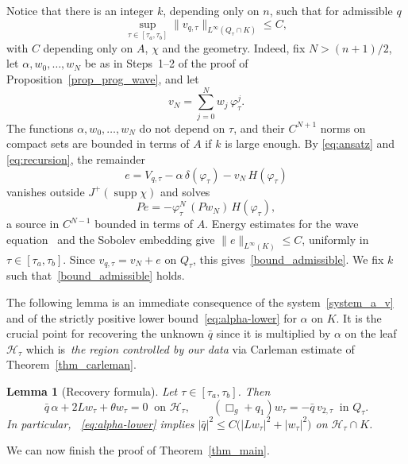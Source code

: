 \documentclass[12pt,reqno]{amsart}
\numberwithin{equation}{section}
\theoremstyle{definition}
\theoremstyle{plain}
\newtheorem{lemma}[theorem]{Lemma}
\theoremstyle{definition}
\theoremstyle{definition}
\newcommand{\Ht}{\mathcal{H}_{\tau}}
\DeclareMathOperator{\supp}{supp}
\begin{document}
Notice that there is an integer $k$, depending only on $n$, such that for admissible $q$
\begin{equation}
    \label{bound_admissible}
    \sup_{\tau\in[\tau_a,\tau_b]}\|v_{q,\tau}\|_{L^\infty(Q_\tau\cap K)}\le C,
\end{equation}
with $C$ depending only on $A$, $\chi$ and the geometry. Indeed, fix $N>(n+1)/2$, let $\alpha,w_0,\dots,w_N$ be as in Steps~1--2 of the proof of Proposition~\ref{prop_prog_wave}, and let
\[
v_N=\sum_{j=0}^Nw_j\,\varphi_\tau^j .
\]
The functions $\alpha,w_0,\dots,w_N$ do not depend on $\tau$, and their $C^{N+1}$ norms on compact sets are bounded in terms of $A$ if $k$ is large enough. By \eqref{eq:ansatz} and \eqref{eq:recursion}, the remainder
\[
e=V_{q,\tau}-\alpha\,\delta(\varphi_\tau)-v_N\,H(\varphi_\tau)
\]
vanishes outside $J^+(\supp\chi)$ and solves
\[
Pe=-\varphi_\tau^N\,(Pw_N)\,H(\varphi_\tau),
\]
a source in $C^{N-1}$ bounded in terms of $A$. Energy estimates for the wave equation~\cite[Chapter 23]{hormander2007} and the Sobolev embedding give $\|e\|_{L^\infty(K)}\le C$, uniformly in $\tau\in[\tau_a,\tau_b]$. Since $v_{q,\tau}=v_N+e$ on $Q_\tau$, this gives~\eqref{bound_admissible}. We fix $k$ such that~\eqref{bound_admissible} holds.



\medskip



The following lemma is an immediate consequence of the system~\eqref{system_a_v} and of the strictly positive lower bound~\eqref{eq:alpha-lower} for $\alpha$ on $K$. It is the crucial point for recovering the unknown $\bar q$ since it is multiplied by $\alpha$ on the leaf $\mathcal H_\tau$ which is~\textit{the region controlled by our data} via Carleman estimate of Theorem~\ref{thm_carleman}.



\begin{lemma}[Recovery formula]\label{lem_recovery}
Let $\tau\in[\tau_a,\tau_b]$. Then
\begin{equation}\label{eq_recovery}
\bar q\,\alpha+2Lw_\tau+\theta w_\tau=0\ \text{ on }\Ht,\qquad (\Box_g+q_1)w_\tau=-\bar q\,v_{2,\tau}\ \text{ in }Q_\tau .
\end{equation}
In particular, ~\eqref{eq:alpha-lower} implies $|\bar q|^2\le C \bigl(|Lw_\tau|^2+|w_\tau|^2\bigr)$ on $\Ht\cap K$.
\end{lemma}


We can now finish the proof of Theorem~\ref{thm_main}.
\end{document}
